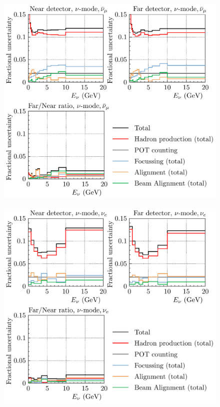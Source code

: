 \documentclass{article}
\begin{document}
\begin{figure}
  \includegraphics[width=\textwidth]{plots/fracerrs/numode_numubar_ErrType}
  \caption{}
  \label{fig:grp_nu_numubar}
\end{figure}

\begin{figure}
  \includegraphics[width=\textwidth]{plots/fracerrs/numode_nue_ErrType}
  \caption{}
  \label{fig:grp_nu_nue}
\end{figure}
\end{document}
